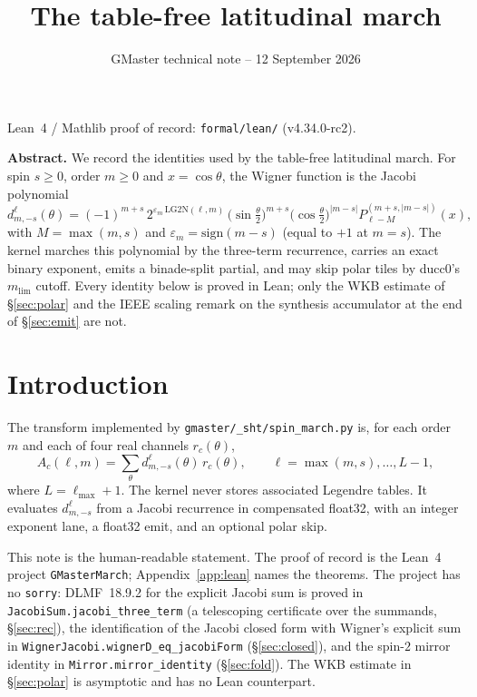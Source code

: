 \documentclass[11pt,a4paper]{article}
\title{\textbf{The table-free latitudinal march}}
\author{}
\date{GMaster technical note -- 12 September 2026}
\newcommand{\LG}{\mathrm{LG2N}}
\newcommand{\mlim}{m_{\mathrm{lim}}}
\numberwithin{equation}{section}
\begin{document}
\maketitle
\vspace{-2.2em}

\begin{center}
{\small Lean~4 / Mathlib proof of record: \texttt{formal/lean/} (v4.34.0-rc2).}
\end{center}

\medskip
\noindent\textbf{Abstract.}
We record the identities used by the table-free latitudinal march.  For spin
$s\ge 0$, order $m\ge 0$ and $x=\cos\theta$, the Wigner function is the Jacobi
polynomial
\begin{equation*}
d^\ell_{m,-s}(\theta)
  =(-1)^{m+s}\,
   2^{\varepsilon_m\,\LG(\ell,m)}\,
   \bigl(\sin\tfrac{\theta}{2}\bigr)^{m+s}
   \bigl(\cos\tfrac{\theta}{2}\bigr)^{\lvert m-s\rvert}
   P_{\ell-M}^{(m+s,\lvert m-s\rvert)}(x),
\end{equation*}
with $M=\max(m,s)$ and $\varepsilon_m=\mathrm{sign}(m-s)$ (equal to $+1$ at
$m=s$).  The kernel marches this polynomial by the three-term recurrence,
carries an exact binary exponent, emits a binade-split partial, and may skip
polar tiles by ducc0's $\mlim$ cutoff.  Every identity below is proved in
Lean; only the WKB estimate of \S\ref{sec:polar} and the IEEE scaling remark
on the synthesis accumulator at the end of \S\ref{sec:emit} are not.

\tableofcontents

\section{Introduction}

The transform implemented by \texttt{gmaster/\_sht/spin\_march.py} is, for
each order $m$ and each of four real channels $r_c(\theta)$,
\begin{equation}
\label{eq:A}
A_c(\ell,m)
  =\sum_{\theta} d^\ell_{m,-s}(\theta)\, r_c(\theta),
  \qquad
  \ell=\max(m,s),\dots,L-1,
\end{equation}
where $L=\ell_{\max}+1$.  The kernel never stores associated Legendre tables.
It evaluates $d^\ell_{m,-s}$ from a Jacobi recurrence in compensated float32,
with an integer exponent lane, a float32 emit, and an optional polar skip.

This note is the human-readable statement.  The proof of record is the Lean~4
project \texttt{GMasterMarch}; Appendix~\ref{app:lean} names the theorems.
The project has no \texttt{sorry}: DLMF~18.9.2 for the explicit Jacobi sum
is proved in \texttt{JacobiSum.jacobi\_three\_term} (a telescoping certificate
over the summands, \S\ref{sec:rec}), the identification of the Jacobi closed
form with Wigner's explicit sum in \texttt{WignerJacobi.wignerD\_eq\_jacobiForm}
(\S\ref{sec:closed}), and the spin-$2$ mirror identity in
\texttt{Mirror.mirror\_identity} (\S\ref{sec:fold}).  The WKB estimate in
\S\ref{sec:polar} is asymptotic and has no Lean counterpart.
\end{document}
